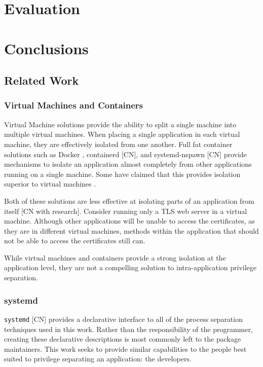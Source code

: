 \documentclass[a4paper,12pt,twoside,openright]{report}
\begin{document}
\chapter{Evaluation}
\label{chap:evaluation}



\chapter{Conclusions}
\label{chap:conclusions}

\section{Related Work}

\subsection{Virtual Machines and Containers}

Virtual Machine solutions \citep{barham_xen_2003,vmware_inc_understanding_2008} provide the ability to split a single machine into multiple virtual machines. When placing a single application in each virtual machine, they are effectively isolated from one another. Full fat container solutions such as Docker \citep{merkel_docker_2014}, containerd [CN], and systemd-nspawn [CN] provide mechanisms to isolate an application almost completely from other applications running on a single machine. Some have claimed that this provides isolation superior to virtual machines \citep{soltesz_container-based_2007}.

Both of these solutions are less effective at isolating parts of an application from itself [CN with research]. Consider running only a TLS web server in a virtual machine. Although other applications will be unable to access the certificates, as they are in different virtual machines, methods within the application that should not be able to access the certificates still can.

While virtual machines and containers provide a strong isolation at the application level, they are not a compelling solution to intra-application privilege separation.

\subsection{systemd}

\texttt{systemd} [CN] provides a declarative interface to all of the process separation techniques used in this work. Rather than the responsibility of the programmer, creating these declarative descriptions is most commonly left to the package maintainers. This work seeks to provide similar capabilities to the people best suited to privilege separating an application: the developers.
\end{document}
